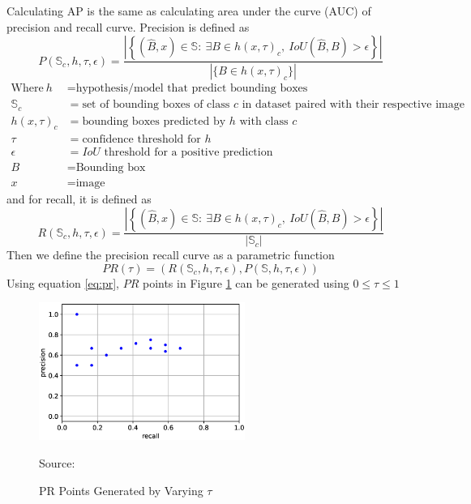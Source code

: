   Calculating AP is the same as calculating area under the curve (AUC) of precision and recall curve.
  Precision is defined as
  \begin{equation}
    P(\mathbb{S}_c,h,\tau,\epsilon) = \dfrac{\left|\left\{(\hat{B},x) \in \mathbb{S} :\ \exists B \in h(x,\tau)_c,\ IoU(\hat{B},B) > \epsilon  \right\}\right|}{\left| \{B \in h(x,\tau)_c\} \right|}
    \label{eq:precision}
  \end{equation}
  \begin{align*}
    \text{Where}~ h &=  \text{hypothesis/model that predict bounding boxes}\\%
    \mathbb{S}_c &= \text{set of bounding boxes of class $c$ in dataset paired with their respective image}\\
    h(x,\tau)_c &= \text{bounding boxes predicted by $h$ with class $c$}\\
    \tau &= \text{confidence threshold for $h$} \\
    \epsilon &= \text{$IoU$ threshold for a positive prediction}\\
    B &= \text{Bounding box}\\
    x &= \text{image}
  \end{align*}
  and for recall, it is defined as
  \begin{equation}
    R(\mathbb{S}_c,h,\tau,\epsilon) = \dfrac{\left|\left\{(\hat{B},x) \in \mathbb{S} :\ \exists B \in h(x,\tau)_c,\ IoU(\hat{B},B) > \epsilon  \right\}\right|}{\left| \mathbb{S}_c \right|}
    \label{eq:recall}
  \end{equation}
  Then we define the precision recall curve as a parametric function
  \begin{equation}
    PR(\tau) = \left( R(\mathbb{S}_c,h,\tau,\epsilon),P(\mathbb{S},h,\tau,\epsilon) \right)
    \label{eq:pr}
  \end{equation}
  Using equation \ref{eq:pr}, $PR$ points in Figure \ref{fig:pr-curve} can be generated using $0 \leq \tau \leq 1$
  \begin{figure}[H]
        \centering
        \includegraphics[width=0.6\textwidth]{figures/pr-curve.png}
        \vspace{-1ex}
        \caption*{Source: \textcite{map-hui}}
        \vspace{-1ex}
        \caption{PR Points Generated by Varying $\tau$}
        \label{fig:pr-curve}
  \end{figure}

